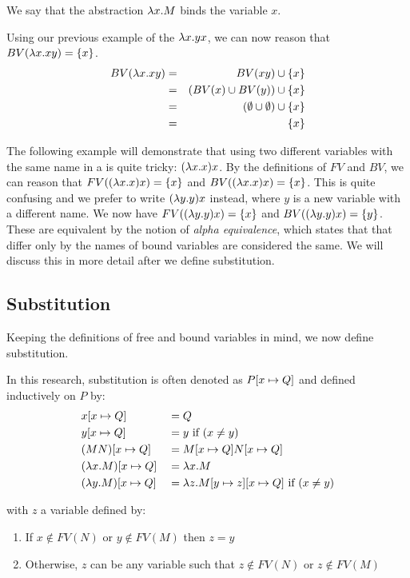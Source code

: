 We say that the abstraction $\lambda {x}.{M}$ binds the variable $x$. 

\begin{example}
	Using our previous example of the \lterm $\lambda {x}.{yx}$, we can now reason that $BV(\lambda {x}.{xy}) = \{x\}$. 
	\begin{eqnarray*}
		BV(\lambda {x}.{xy}) &=& BV(xy) \cup \{x\} \\
		&=& (BV(x) \cup BV(y)) \cup \{x\} \\
		&=& (\emptyset \cup \emptyset) \cup \{x\} \\
		&=& \{x\}
	\end{eqnarray*}
\end{example}


The following example will demonstrate that using two different variables with the same name in a \lterm is quite tricky: $(\lambda {x}.{x})x$.
By the definitions of $FV$ and $BV$, we can reason that $FV((\lambda {x}.{x})x) = \{x\}$ and $BV((\lambda {x}.{x})x) = \{x\}$.
This is quite confusing and we prefer to write $(\lambda {y}.{y})x$ instead, where $y$ is a new variable with a different name.
We now have $FV((\lambda {y}.{y})x) = \{x\}$ and $BV((\lambda {y}.{y})x) = \{y\}$.
These \lterms are equivalent by the notion of \emph{alpha equivalence}, which states that \lterms that differ only by the names of bound variables are considered the same.
We will discuss this in more detail after we define substitution.

\subsection{Substitution}
Keeping the definitions of free and bound variables in mind, we now define substitution. 

\begin{definition}[Substitution]
	In this research, substitution is often denoted as $P [{x}\mapsto{Q}]$ and defined inductively on $P$ by:
	\[
	\begin{aligned}
		& x [{x}\mapsto{Q}]             & &= Q \\
		& y [{x}\mapsto{Q}]             & &= y \text{ if } (x \neq y)\\
		& (M N) [{x}\mapsto{Q}]         & &= M [{x}\mapsto{Q}] N [{x}\mapsto{Q}] \\
		& (\lambda {x}.{M}) [{x}\mapsto{Q}] & &= \lambda {x}.{M} \\
		& (\lambda {y}.{M}) [{x}\mapsto{Q}] & &= \lambda {z}.{M [{y}\mapsto{z}][{x}\mapsto{Q}]} \text{ if } (x \neq y) \\
	\end{aligned}
	\]

	with $z$ a variable defined by:
	\begin{enumerate}
		\item%
		If $x \notin FV(N)$ or $y \notin FV(M)$ then $z = y$
		\item%
		Otherwise, $z$ can be any variable such that $z \notin FV(N)$ or $z \notin FV(M)$
	\end{enumerate}
\end{definition}



